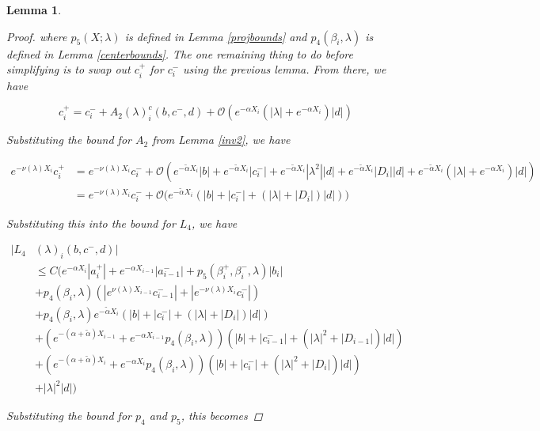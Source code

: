 \documentclass[12pt]{article}
\newtheorem{lemma}{Lemma}
\begin{document}
\begin{lemma}
\begin{proof}
where $p_5(X; \lambda)$ is defined in Lemma \ref{projbounds} and $p_4(\beta_i, \lambda)$ is defined in Lemma \ref{centerbounds}. The one remaining thing to do before simplifying is to swap out $c_i^+$ for $c_i^-$ using the previous lemma. From there, we have

\[
c_i^+ = c_i^- + A_2(\lambda)_i^c(b, c^-, d) + \mathcal{O}( e^{-\alpha X_i} (|\lambda| +  e^{-\alpha X_i} ) |d| )
\]

Substituting the bound for $A_2$ from Lemma \ref{inv2}, we have

\begin{align*}
e^{-\nu(\lambda)X_i} c_i^+ &= e^{-\nu(\lambda)X_i} c_i^- + \mathcal{O}( e^{-\tilde{\alpha} X_i} |b| + e^{-\tilde{\alpha} X_i} |c_i^-| + e^{-\tilde{\alpha} X_i} |\lambda^2| |d| + e^{-\tilde{\alpha} X_i}|D_i||d| + e^{-\tilde{\alpha} X_i} (|\lambda| +  e^{-\alpha X_i} ) |d| ) \\
&= e^{-\nu(\lambda)X_i} c_i^- + \mathcal{O}\Big( e^{-\tilde{\alpha} X_i}(|b| + |c_i^-| + (|\lambda| + |D_i|)|d| ) \Big)
\end{align*}

Substituting this into the bound for $L_4$, we have

\begin{align*}
|L_4&(\lambda)_i(b, c^-, d)|\\ 
&\leq C \Big( e^{-\alpha X_i} |a_i^+| +  e^{-\alpha X_{i-1}} |a_{i-1}^-| + p_5(\beta_i^+, \beta_i^-, \lambda) |b_i| \\
&+ p_4(\beta_i, \lambda)( |e^{\nu(\lambda)X_{i-1}} c_{i-1}^-| + |e^{-\nu(\lambda)X_i} c_i^-|) \\
&+ p_4(\beta_i, \lambda)e^{-\tilde{\alpha} X_i}(|b| + |c_i^-| + (|\lambda| + |D_i|)|d| ) \\
&+ (e^{-(\alpha + \tilde{\alpha}) X_{i-1}} + e^{-\alpha X_{i-1}} p_4(\beta_i, \lambda))( |b| + |c_{i-1}^-| + (|\lambda|^2 + |D_{i-1}|)|d| ) \\
&+ (e^{-(\alpha + \tilde{\alpha}) X_i} + e^{-\alpha X_i} p_4(\beta_i, \lambda))( |b| + |c_i^-| + (|\lambda|^2 + |D_i|)|d| ) \\
&+ |\lambda|^2 |d|  \Big)
\end{align*}

Substituting the bound for $p_4$ and $p_5$, this becomes


\end{proof}
\end{lemma}
\end{document}
